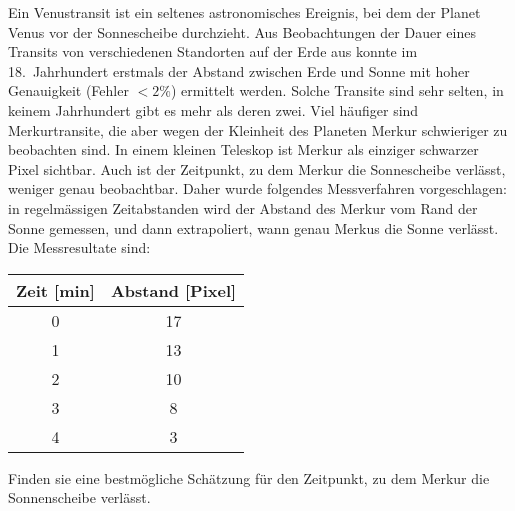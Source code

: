 Ein Venustransit ist ein seltenes astronomisches Ereignis, bei dem
der Planet Venus vor der Sonnescheibe durchzieht.
Aus Beobachtungen der Dauer eines Transits von verschiedenen Standorten
auf der Erde aus konnte im 18.~Jahrhundert erstmals der Abstand
zwischen Erde und Sonne mit hoher Genauigkeit (Fehler $< 2\%$) ermittelt
werden. Solche Transite sind sehr selten, in keinem Jahrhundert gibt es
mehr als deren zwei. Viel häufiger sind Merkurtransite, die aber wegen
der Kleinheit des Planeten Merkur schwieriger zu beobachten sind.
In einem kleinen Teleskop ist Merkur als einziger schwarzer Pixel
sichtbar. Auch ist der Zeitpunkt, zu dem Merkur die Sonnescheibe
verlässt, weniger genau beobachtbar. Daher wurde folgendes Messverfahren
vorgeschlagen: in regelmässigen Zeitabstanden wird der Abstand des
Merkur vom Rand der Sonne gemessen, und dann extrapoliert, wann genau
Merkus die Sonne verlässt. Die Messresultate sind:
\begin{center}
\begin{tabular}{cc}
Zeit [min]&Abstand [Pixel]\\
\hline
0&17\\
1&13\\
2&10\\
3&8\\
4&3\\
\hline
\end{tabular}
\end{center}
Finden sie eine bestmögliche Schätzung für den Zeitpunkt, zu dem
Merkur die Sonnenscheibe verlässt.

